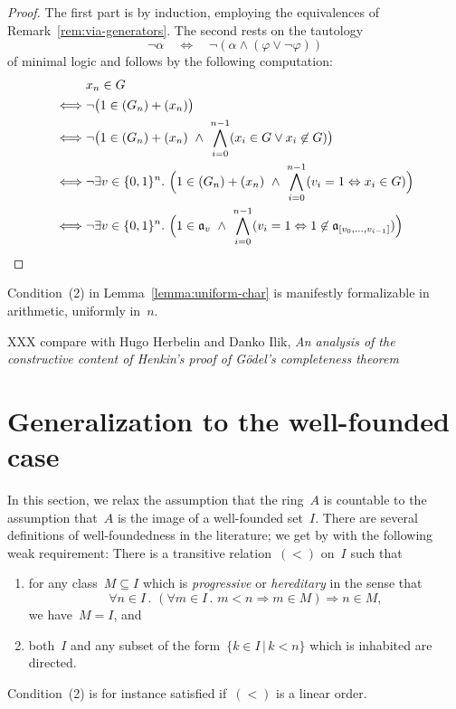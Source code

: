 \documentclass[oneside,reqno]{amsart}
\theoremstyle{definition}
\theoremstyle{plain}
\theoremstyle{remark}
\newcommand{\aaa}{\mathfrak{a}}
\renewcommand{\_}{\mathpunct{.}\,}
\begin{document}
\begin{proof}The first part is by induction, employing the equivalences of
Remark~\ref{rem:via-generators}. The second rests on the tautology
\[ \neg\alpha \quad\Longleftrightarrow\quad \neg(\alpha \wedge (\varphi \vee \neg\varphi)) \]
of minimal logic and follows by the following computation:
\begin{align*}
  &\mathrel{\phantom{\Longleftrightarrow}} x_n \in G \\
  &\Longleftrightarrow \neg\bigl(1 \in (G_n) + (x_n)\bigr) \\
  &\Longleftrightarrow \neg\bigl(1 \in (G_n) + (x_n) \ \wedge\ \bigwedge_{i=0}^{n-1} (x_i \in G \vee x_i \not\in G)\bigr) \\
  &\Longleftrightarrow \neg\exists v \in \{0,1\}^n\_
    \Bigl(1 \in (G_n) + (x_n) \ \wedge\ \bigwedge_{i=0}^{n-1} (v_i = 1
    \Leftrightarrow x_i \in G)\Bigr) \\
  &\Longleftrightarrow \neg\exists v \in \{0,1\}^n\_
    \Bigl(1 \in \aaa_v \ \wedge\ \bigwedge_{i=0}^{n-1} (v_i = 1
    \Leftrightarrow 1 \not\in \aaa_{[v_0,\ldots,v_{i-1}]})\Bigr) \qedhere
\end{align*}
\end{proof}

Condition~(2) in Lemma~\ref{lemma:uniform-char} is manifestly formalizable in
arithmetic, uniformly in~$n$.

XXX compare with Hugo Herbelin and Danko Ilik, \emph{An analysis of the
constructive content of Henkin’s proof of
Gödel’s completeness theorem}


\section{Generalization to the well-founded case}

In this section, we relax the assumption that the ring~$A$ is countable to the
assumption that~$A$ is the image of a well-founded set~$I$. There are several
definitions of well-foundedness in the literature; we get by with the following
weak requirement: There is a transitive relation~$({<})$ on~$I$ such that
\begin{enumerate}
\item for any class~$M \subseteq I$ which is \emph{progressive} or
\emph{hereditary} in the sense that
\[ \forall n \in I\_
  (\forall m \in I\_ m < n \Rightarrow m \in M) \Longrightarrow n \in M, \]
we have~$M = I$, and
\item both~$I$ and any subset of the form~$\{k \in I \,|\, k < n\}$ which is
inhabited are directed.
\end{enumerate}
Condition~(2) is for instance satisfied if~$({<})$ is a linear order.
\end{document}
